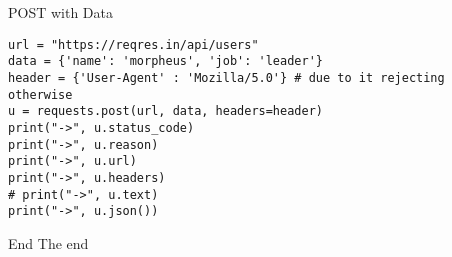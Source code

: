\begin{frame}[containsverbatim]{POST with Data}
\begin{verbatim}
url = "https://reqres.in/api/users"
data = {'name': 'morpheus', 'job': 'leader'}
header = {'User-Agent' : 'Mozilla/5.0'} # due to it rejecting otherwise
u = requests.post(url, data, headers=header)
print("->", u.status_code)
print("->", u.reason)
print("->", u.url)
print("->", u.headers)
# print("->", u.text)
print("->", u.json())
\end{verbatim}
\end{frame}

\begin{frame}[standout]{End}
  The end
\end{frame}


